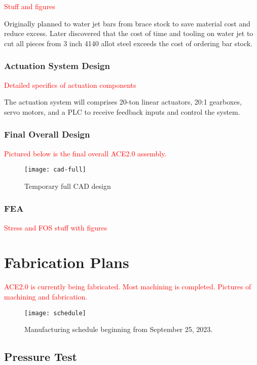 \textcolor{red}{Stuff and figures}

Originally planned to water jet bars from brace stock to save material cost and reduce excess. Later discovered that the cost of time and tooling on water jet to cut all pieces from 3 inch 4140 allot steel exceeds the cost of ordering bar stock.

\subsubsection{Actuation System Design}

\textcolor{red}{Detailed specifics of actuation components}

The actuation system will comprises 20-ton linear actuators, 20:1 gearboxes, servo motors, and a PLC to receive feedback inputs and control the system.

\subsubsection{Final Overall Design}

\textcolor{red}{Pictured below is the final overall ACE2.0 assembly.}

\begin{figure}[ht!]
    \centering
    \texttt{[image: cad-full]}
    \caption{Temporary full CAD design}
    \label{fig:cad-full}
\end{figure}

\subsubsection{FEA}

\textcolor{red}{Stress and FOS stuff with figures}

\section{Fabrication Plans}

\textcolor{red}{ACE2.0 is currently being fabricated. Most machining is completed. Pictures of machining and fabrication.}

\begin{figure}[ht!]
    \centering
    \texttt{[image: schedule]}
    \caption{Manufacturing schedule beginning from September 25, 2023.}
    \label{fig:schedule}
\end{figure}

\subsection{Pressure Test}

